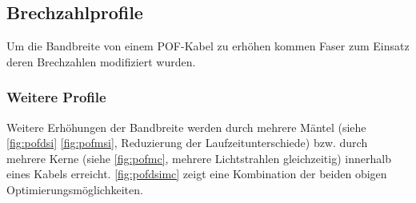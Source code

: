 \subsection{Brechzahlprofile}
\label{subsec:pofbrechzahlprofile}

Um die Bandbreite von einem POF-Kabel zu erhöhen kommen Faser zum Einsatz deren
Brechzahlen modifiziert wurden.




\subsubsection{Weitere Profile}

Weitere Erhöhungen der Bandbreite werden durch mehrere Mäntel (siehe
\autoref{fig:pofdsi} \autoref{fig:pofmsi}, Reduzierung der Laufzeitunterschiede)
bzw. durch mehrere Kerne (siehe \autoref{fig:pofmc}, mehrere Lichtstrahlen
gleichzeitig) innerhalb eines Kabels erreicht. \autoref{fig:pofdsimc} zeigt eine
Kombination der beiden obigen Optimierungsmöglichkeiten.
\cite{pofacprofile}

